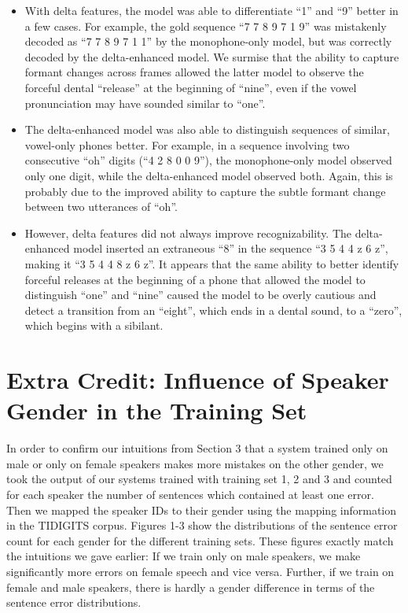 \documentclass[twocolumn, 11pt]{article}
\begin{document}
\begin{itemize}
  \item With delta features, the model was able to differentiate ``1'' and ``9''
  better in a few cases. For example, the gold sequence ``7 7 8 9 7 1 9'' was
  mistakenly decoded as ``7 7 8 9 7 1 1'' by the monophone-only model, but was
  correctly decoded by the delta-enhanced model. We surmise that the ability to
  capture formant changes across frames allowed the latter model to observe the
  forceful dental ``release'' at the beginning of ``nine'', even if the vowel
  pronunciation may have sounded similar to ``one''.
  \item The delta-enhanced model was also able to distinguish sequences of
  similar, vowel-only phones better. For example, in a sequence involving two
  consecutive ``oh'' digits (``4 2 8 0 0 9''), the monophone-only model observed
  only one digit, while the delta-enhanced model observed both. Again, this is
  probably due to the improved ability to capture the subtle formant change
  between two utterances of ``oh''.
  \item However, delta features did not always improve recognizability. The
  delta-enhanced model inserted an extraneous ``8'' in the sequence ``3 5 4 4 z
  6 z'', making it ``3 5 4 4 8 z 6 z''. It appears that the same ability to
  better identify forceful releases at the beginning of a phone that allowed the
  model to distinguish ``one'' and ``nine'' caused the model to be overly
  cautious and detect a transition from an ``eight'', which ends in a dental
  sound, to a ``zero'', which begins with a sibilant.
\end{itemize}

\section{Extra Credit: Influence of Speaker Gender in the Training Set}
In order to confirm our intuitions from Section 3 that a system trained only on  male 
or only on female speakers makes more mistakes on the other gender, we took the output 
of our systems trained with training set 1, 2 and 3 and counted for each speaker 
the number of sentences which contained at least one error. Then we mapped the speaker 
IDs to their gender using the mapping information in the TIDIGITS corpus. Figures 1-3 show 
the distributions of the sentence error count for each gender for the different training sets. 
These figures exactly match the intuitions we gave earlier: If we train only on male speakers, 
we make significantly more errors on female speech and vice versa. Further, if we 
train on female and male speakers, there is hardly a gender difference in terms of the
sentence error distributions. 
\end{document}
